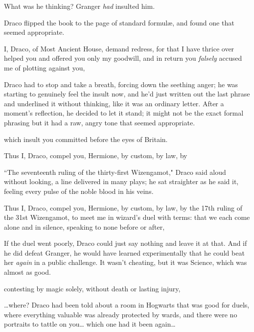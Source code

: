 What was he thinking? Granger \emph{had} insulted him.

Draco flipped the book to the page of standard formulæ, and found one that seemed appropriate.

\begin{writtenNote}
I, Draco, of Most Ancient House, demand redress, for that I have thrice over helped you and offered you only my goodwill, and in return you \emph{falsely} accused me of plotting against you,
\end{writtenNote}

Draco had to stop and take a breath, forcing down the seething anger; he was starting to genuinely feel the insult now, and he'd just written out the last phrase and underlined it without thinking, like it was an ordinary letter. After a moment's reflection, he decided to let it stand; it might not be the exact formal phrasing but it had a raw, angry tone that seemed appropriate.

\begin{writtenNote}
which insult you committed before the eyes of Britain.

Thus I, Draco, compel you, Hermione, by custom, by law, by
\end{writtenNote}

``The seventeenth ruling of the thirty-first Wizengamot," Draco said aloud without looking, a line delivered in many plays; he sat straighter as he said it, feeling every pulse of the noble blood in his veins.

\begin{writtenNote}
Thus I, Draco, compel you, Hermione, by custom, by law, by the 17th ruling of the 31st Wizengamot, to meet me in wizard's duel with terms: that we each come alone and in silence, speaking to none before or after,
\end{writtenNote}

If the duel went poorly, Draco could just say nothing and leave it at that. And if he did defeat Granger, he would have learned experimentally that he could beat her \emph{again} in a public challenge. It wasn't cheating, but it was Science, which was almost as good.

\begin{writtenNote}
contesting by magic solely, without death or lasting injury,
\end{writtenNote}

{\ldots}where? Draco had been told about a room in Hogwarts that was good for duels, where everything valuable was already protected by wards, and there were no portraits to tattle on you{\ldots} which one had it been again{\ldots}

